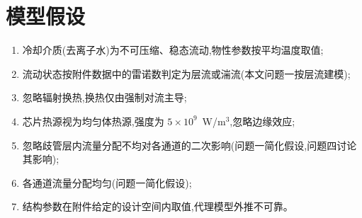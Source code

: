 %
\section{模型假设}

\begin{enumerate}
  \item 冷却介质(去离子水)为不可压缩、稳态流动,物性参数按平均温度取值;
  \item 流动状态按附件数据中的雷诺数判定为层流或湍流(本文问题一按层流建模);
  \item 忽略辐射换热,换热仅由强制对流主导;
  \item 芯片热源视为均匀体热源,强度为 $5\times10^9$~W/m$^3$,忽略边缘效应;
  \item 忽略歧管层内流量分配不均对各通道的二次影响(问题一简化假设,问题四讨论其影响);
  \item 各通道流量分配均匀(问题一简化假设);
  \item 结构参数在附件给定的设计空间内取值,代理模型外推不可靠。
\end{enumerate}
